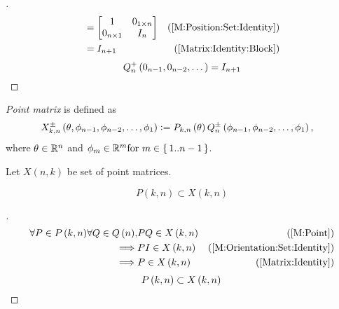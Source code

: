 \documentclass[stu, babel, american, biblatex, a4paper, leqno, draftall]{apa7}
\begin{document}
\begin{proof}[]
\begin{align*}
        &=
		\begin{bmatrix}
            1 & 0_{1\times n}                                                             \\
            0_{n\times 1} & I_{n} \\
        \end{bmatrix} & \text{(\cref{M:Position:Set:Identity})} \\
        &=
		I_{n+1} & \text{(\cref{Matrix:Identity:Block})}
	\end{align*}
    \begin{equation*}
    	Q^+_n
        \left(0_{n-1}, 0_{n-2}, \dots\right)
    	=
    	I_{n+1}
    	\qedhere
    \end{equation*}
\end{proof}
\begin{definition}\label{M:Point}
    \textit{Point matrix} is defined as
    \begin{align*}
        X^\pm_{k,n}\left(\theta,\phi_{n-1},\phi_{n-2},\dots,\phi_1\right) & \vcentcolon=
        P_{k,n}\left(\theta\right)
        Q^\pm_n\left(\phi_{n-1},\phi_{n-2},\dots,\phi_1\right)\text{,}
    \end{align*}
    where $\theta\in\mathbb{R}^n$ and $\phi_m\in\mathbb{R}^m \text{for } m\in\set{1..n-1}$.
\end{definition}
\begin{definition}\label{M:Point:Set}
    Let $X\left(n,k\right)$ be set of point matrices.
\end{definition}
\begin{corollary}\label{M:Point:Position}
    \begin{equation*}
        P\left(k,n\right)\subset X\left(k,n\right)
    \end{equation*}
\end{corollary}
\begin{proof}[]
    \begin{align*}
    	\forall{P \in P\left(k,n\right)}
    	\forall{Q\in Q\left(n\right)},
    	&
    	P Q \in X\left(k,n\right) & \text{(\cref{M:Point})} \\
    	\implies &
    	P I \in X\left(k,n\right) & \text{(\cref{M:Orientation:Set:Identity})} \\
    	\implies &
    	P \in X\left(k,n\right) & \text{(\cref{Matrix:Identity})} 
    \end{align*}
    \begin{equation*}
    	P\left(k,n\right)\subset X\left(k,n\right) \qedhere
    \end{equation*}
\end{proof}
\end{document}
